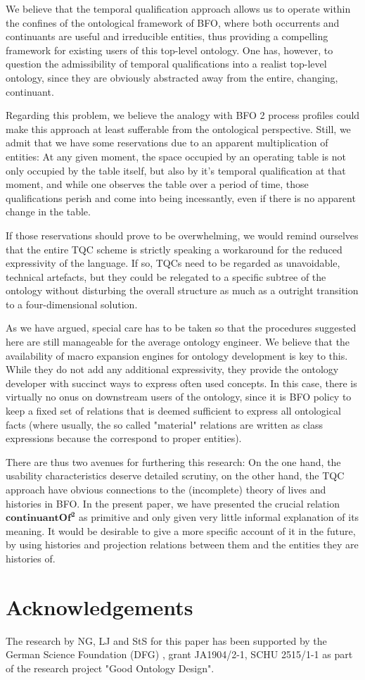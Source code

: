 \documentclass{ao2e}
\newcommand{\mirel}[1]{\ensuremath{\mathrm{\mathbf{#1}}}}
\newcommand{\mrel}[2]{\mirel{#1^#2}}
\newcommand{\mrelb}[1]{\mrel{#1}{2}}
\begin{document}
We believe that the temporal qualification approach allows us to operate within
the confines of the ontological framework of BFO, where both occurrents and
continuants are useful and irreducible entities, thus providing a compelling
framework for existing users of this top-level ontology. One has, however, to
question the admissibility of temporal qualifications into a
realist top-level ontology, since they are obviously abstracted away from the
entire, changing, continuant. 

Regarding this problem, we believe the analogy with BFO 2 process profiles could 
make this approach at least sufferable from the
ontological perspective. Still, we admit that we have some reservations due to
an apparent multiplication of entities: At any given moment, the space occupied
by an operating table is not only occupied by the table itself, but also by it's
temporal qualification at that moment, and while one observes the table over a
period of time, those qualifications perish and come
into being incessantly, even if there is no apparent change in the table.  

If those reservations should prove to be overwhelming, we would remind ourselves
that the entire TQC scheme is strictly speaking a workaround for the reduced
expressivity of the language. If so, TQCs  need to be regarded as
unavoidable, technical artefacts, but they could be relegated to a specific
subtree of the ontology without disturbing the overall structure as much as a
outright transition to a four-dimensional solution.

As we have argued, special care has to be taken so that the procedures suggested
here are still manageable for the average ontology engineer. We
believe that the availability of macro expansion engines for ontology
development is key to this. While they do not add any additional expressivity, they
provide the ontology developer with succinct ways to express often used
concepts. In this case, there is virtually no onus on downstream users of the
ontology, since it is BFO policy to keep a fixed set of relations that is deemed
sufficient to express all ontological facts (where usually, the so called
"material" relations are written as class expressions because the correspond to
proper entities). 

There are thus two avenues for furthering this research: On the one hand, the
usability characteristics deserve detailed scrutiny, on the other hand, the
TQC approach have obvious connections to the (incomplete) theory of lives and
histories in BFO.
In the present paper, we have presented the crucial
relation \mrelb{continuantOf} as primitive and only given very little informal
explanation of its meaning. It would be desirable to give a more specific account of it in the
future, by using histories and projection relations between them and the
entities they are histories of.
\section*{Acknowledgements}
The research by NG, LJ and StS for this paper has been supported by the German
Science Foundation (DFG) , grant
JA1904/2-1, SCHU 2515/1-1 as part of the research project "Good Ontology Design".
%
\printbibliography
\end{document}
